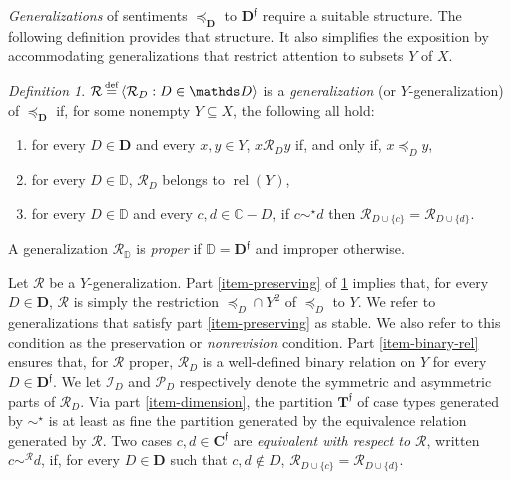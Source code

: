 \documentclass[ecta,nameyear,draft]{econsocart}
\newcommand{\bs}{-}%
\newcommand{\mc}{\mathcal}
\newcommand\defeq{\mathrel{\overset{\makebox[0pt]{\mbox{\normalfont\tiny def}}}{=}}}%
\newcommand{\relations}{\operatorname{rel}}
\newcommand{\novel}{\mathfrak f}
\newcommand{\precsimb}{\mathbin{\preceq}}
\newcommand{\preceqb}{\mathbin{\preceq}}
\newcommand{\ext}{\mathrel{\mc R}}
\newcommand{\sext}{\mathrel{\mc P}}
\newcommand{\next}{\mathrel{\mc I}}
\newcommand{\extb}{\mathbin{\mc R}}
\newcommand{\mbbd}{{\mathbf D}}
\newcommand{\mbbdp}{{\mathbf D^{\novel}}}
\newcommand{\dpp}{{\mathds D}}
\newcommand{\mbbcp}{{\mathbf C^{\novel}}}
\newcommand{\cpp}{{\mathds C}}
\newcommand{\mbbtp}{{\mathbf{T}^\novel}}
\theoremstyle{plain}
\theoremstyle{remark}
\newtheorem{definition}{Definition}%
\begin{document}
\emph{Generalizations} of sentiments $\precsimb_\mbbd$ to $\mbbdp$ require a
suitable structure. The following definition provides that structure. It also
simplifies the exposition by accommodating generalizations that restrict
attention to subsets $Y$ of $X$.
\begin{definition}\label{def-generalization} $\extb \defeq \langle \extb_{D}:
  D\in \dpp \rangle$ is a \emph{generalization} (or $Y$-generalization) of
  $\preceq_{\mbbd}$ if, for some nonempty $Y \subseteq X$, the following all
  hold$:$
  \begin{enumerate}%
    \item \label{item-preserving} for every $D \in \mbbd$ and every $x,y\in Y$,
      $x \ext_{D} y$ if, and only if, $x \preceq_{D} y$,
    \item\label{item-binary-rel} for every $D\in \dpp$, $\ext_{D}$ belongs to
      $\relations (Y)$,
    \item \label{item-dimension} for every $D\in \dpp$ and every $c,d \in
      \cpp\bs D$,  if $c \sim^\star d$ then $\extb _ {D \cup \{c\}} = \extb _
      {D \cup \{d\}}$.
  \end{enumerate}
  A generalization $\ext_{\dpp}$ is \emph{proper} if $\dpp = \mbbdp$ and
  improper otherwise.
\end{definition}
Let $\ext$ be a $Y$-generalization.  Part \ref{item-preserving} of
\cref{def-generalization} implies that, for every $D\in \mbbd$, $\ext$ is
simply the restriction $\preceqb_{D}\cap Y^{2}$ of $\preceq_{D}$ to $Y$. We
refer to generalizations that satisfy part \ref{item-preserving} as stable. We
also refer to this condition as the preservation or \emph{nonrevision}
condition. Part \ref{item-binary-rel} ensures that, for $\ext$ proper,
$\ext_{D}$ is a well-defined binary relation on $Y$ for every $D \in \mbbdp$.
We let $\next_{D}$ and $\sext_{D}$ respectively denote the symmetric and
asymmetric parts of $\ext_{D}$. Via part \ref{item-dimension}, the partition
$\mbbtp$ of case types generated by $\sim^{\star}$ is at least as fine the
partition generated by the equivalence relation generated by $\ext$. Two cases
$c,d \in \mbbcp$ are \emph{equivalent with respect to $\ext$}, written $c
\sim^{\extb}
d$, if, for every $D \in \mbbd$ such that $c,d \notin D$, $\extb_{D \cup \{c\}}
= \extb_{D \cup \{d\}}$.
\end{document}
